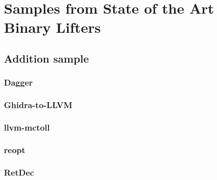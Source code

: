 
\chapter{Samples from State of the Art Binary Lifters}

\section{Addition sample}



\subsection{Dagger}



\subsection{Ghidra-to-LLVM}



\subsection{llvm-mctoll}


\subsection{reopt}



\subsection{RetDec}

